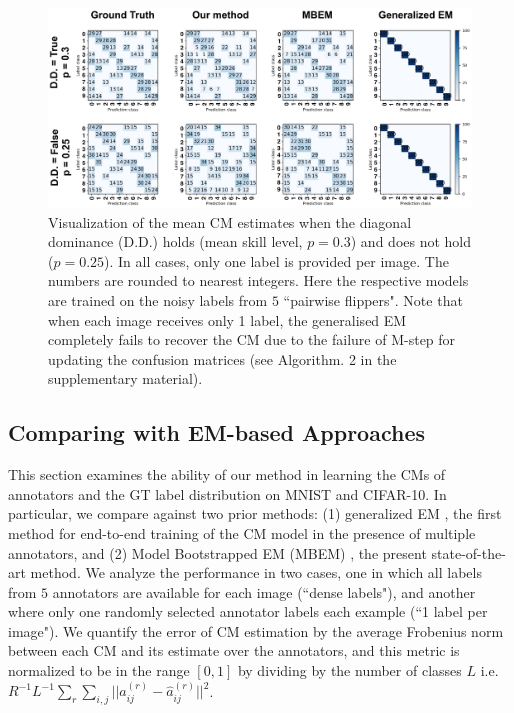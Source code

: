 \begin{figure}[t]
	\center
	\includegraphics[width=\linewidth]{chapter_4/figures/figures_new/figure_4.png}
	\caption{\small Visualization of the mean CM estimates when the diagonal dominance (D.D.) holds (mean skill level, $p=0.3$) and does not hold ($p=0.25$). In all cases, only one label is provided per image. The numbers are rounded to nearest integers. Here the respective models are trained on the noisy labels from $5$ ``pairwise flippers". Note that when each image receives only 1 label, the generalised EM \cite{raykar2009supervised} completely fails to recover the CM due to the failure of M-step for updating the confusion matrices (see Algorithm. 2 in the supplementary material). }
	\label{fig:diagonal_dominance_violation}
\end{figure}


\subsection{Comparing with EM-based Approaches} \label{sec:comparison_with_em}
This section examines the ability of our method in learning the CMs of annotators and the GT label distribution on MNIST and CIFAR-10. In particular, we compare against two prior methods: (1) generalized EM \cite{raykar2010learning}, the first method for end-to-end training of the CM model in the presence of multiple annotators, and (2) Model Bootstrapped EM (MBEM) \cite{khetan2017learning}, the present state-of-the-art method. We analyze the performance in two cases, one in which all labels from $5$ annotators are available for each image (``dense labels"), and another where only one randomly selected annotator labels each example (``1 label per image"). We quantify the error of CM estimation by the average Frobenius norm between each CM and its estimate over the annotators, and this metric is normalized to be in the range $[0,1]$ by dividing by the number of classes $L$ i.e. $R^{-1}L^{-1}\sum_{r}\sum_{i,j}||a^{(r)}_{ij}-\hat{a}^{(r)}_{ij}||^2$.



